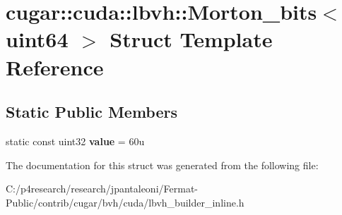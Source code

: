 \hypertarget{structcugar_1_1cuda_1_1lbvh_1_1_morton__bits_3_01uint64_01_4}{}\section{cugar\+:\+:cuda\+:\+:lbvh\+:\+:Morton\+\_\+bits$<$ uint64 $>$ Struct Template Reference}
\label{structcugar_1_1cuda_1_1lbvh_1_1_morton__bits_3_01uint64_01_4}
\subsection*{Static Public Members}
\begin{DoxyCompactItemize}
\item 
\mbox{\label{structcugar_1_1cuda_1_1lbvh_1_1_morton__bits_3_01uint64_01_4_aaeb17017a5873c99f77a2786805de9cd}} 
static const uint32 {\bfseries value} = 60u
\end{DoxyCompactItemize}


The documentation for this struct was generated from the following file\+:\begin{DoxyCompactItemize}
\item 
C\+:/p4research/research/jpantaleoni/\+Fermat-\/\+Public/contrib/cugar/bvh/cuda/lbvh\+\_\+builder\+\_\+inline.\+h\end{DoxyCompactItemize}
